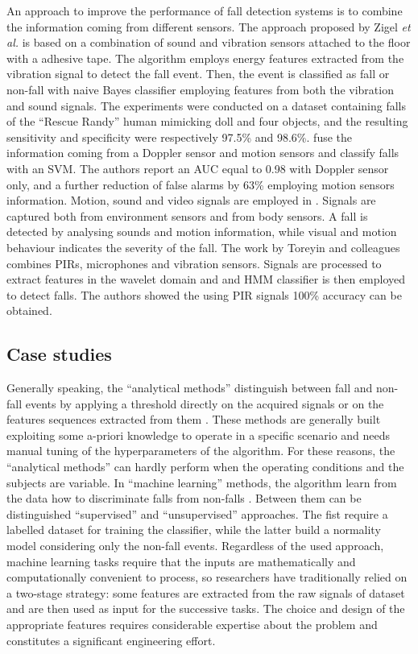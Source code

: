 An approach to improve the performance of fall detection systems is to combine the information coming from different sensors. The approach proposed by Zigel \textit{et al.} \cite{zigel2009method} is based on a combination of sound and vibration sensors attached to the floor with a adhesive tape. The algorithm employs energy features extracted from the vibration signal to detect the fall event. Then, the event is classified as fall or non-fall with naive Bayes classifier employing features from both the vibration and sound signals. The experiments were conducted on a dataset containing falls of the ``Rescue Randy'' human mimicking doll and four objects, and the resulting sensitivity and specificity were respectively 97.5\% and 98.6\%. \cite{Liu2014} fuse the information coming from a Doppler sensor and motion sensors and classify falls with an SVM. The authors report an AUC equal to 0.98 with Doppler sensor only, and a further reduction of false alarms by 63\% employing motion sensors information. Motion, sound and video signals are employed in \cite{Doukas2011}. Signals are captured both from environment sensors and from body sensors. A fall is detected by analysing sounds and motion information, while visual and motion behaviour indicates the severity of the fall. The work by Toreyin and colleagues \cite{Toreyin2008} combines PIRs, microphones and vibration sensors. Signals are processed to extract features in the wavelet domain and and HMM classifier is then employed to detect falls. The authors showed the using PIR signals 100\% accuracy can be obtained.

\subsection{Case studies}
Generally speaking, the ``analytical methods'' distinguish between fall and non-fall events by applying a threshold directly on the acquired signals or on the features sequences extracted from them \cite{noury2007fall}.
These methods are generally built exploiting some a-priori knowledge to operate in a specific scenario and needs manual tuning of the hyperparameters of the algorithm. For these reasons, the ``analytical methods'' can hardly perform when the operating conditions and the subjects are variable. In ``machine learning'' methods, the algorithm learn from the data how to discriminate falls from non-falls \cite{noury2007fall}. Between them can be distinguished ``supervised'' and  ``unsupervised'' approaches. The fist  require a labelled dataset for training the classifier, while the latter build a normality model considering only the non-fall events. Regardless of the used approach, machine learning tasks require that the inputs are mathematically and computationally convenient to process, so researchers have traditionally relied on a two-stage strategy: some features are extracted from the raw signals of dataset and are then used as input for the successive tasks. The choice and design of the appropriate features requires considerable expertise about the problem and constitutes a significant engineering effort.

